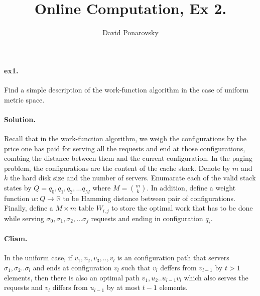 \documentclass{article}
\newcommand{\expp}[1]{ \mathbf{E} \left[ {#1} \right]}
\begin{document}
\newcommand{\dalg}[1]{\expp{#1 : \text{alg} \sim \tilde{\text{alg}}}}
\newcommand{\dsig}[1]{\expp{#1 : \sigma \sim \tilde{\sigma}}}
\newcommand{\calg}{c_{\text{alg}}}
\newcommand{\cbase}{c_{\text{base}}}


\title{Online Computation, Ex 2. } 
\author{David Ponarovsky}
\maketitle

\begin{multicols*}{2}
  \paragraph{ex1.} Find a simple description of the work-function algorithm in the case of uniform metric space. 
  \paragraph{Solution.} Recall that in the work-function algorithm, we weigh the configurations by the price one has paid for serving all the requests and end at those configurations, combing the distance between them and the current configuration. In the paging problem, the configurations are the content of the cache stack.  
  Denote by $m$ and $k$ the hard disk size and the number of servers. Enumarate each of the valid stack states by $Q = q_{0},q_{1},q_{2},\dots q_{M}$  where $M = \binom{m}{k}$. In addition, define a weight function $w : Q \rightarrow \mathbb{R}$ to be Hamming distance between pair of configurations. Finally, define a $M \times m$ table $W_{i,j}$ to store the optimal work that has to be done while serving $\sigma_{0},\sigma_{1},\sigma_{2},\dots \sigma_{j}$ requests and ending in configuration $q_{i}$.     

  \paragraph{Cliam.} In the uniform case, if $v_{1},v_{2},v_{3},..,v_{l}$ is an configuration path that servers $\sigma_{1},\sigma_{2}..\sigma_{l}$ and ends at configuration $v_{l}$ such that $v_{l}$ deffers from $v_{l-1}$ by $t > 1$ elements, then there is also an optimal path $v_{1},u_{2}..u_{l-1}v_{l}$ which also serves the requests and $v_{l}$ differs from $u_{l-1}$ by at most $t-1$ elements. 

\end{multicols*}
\end{document}
